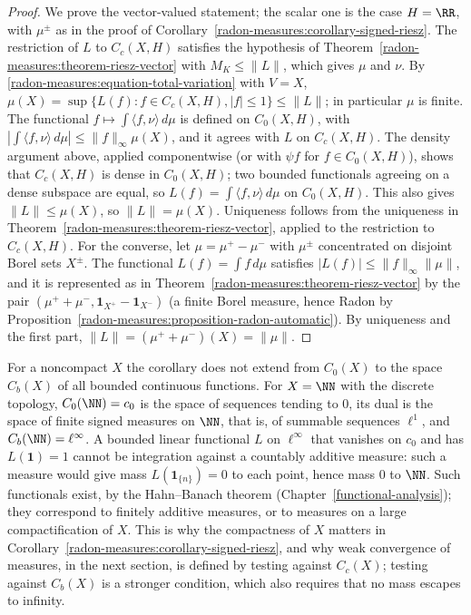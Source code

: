 \begin{proof}
We prove the vector-valued statement; the scalar one is the case $H = \RR$, with $\mu^\pm$ as in the proof of Corollary~\ref{radon-measures:corollary-signed-riesz}. The restriction of $L$ to $C_c(X, H)$
satisfies the hypothesis of Theorem~\ref{radon-measures:theorem-riesz-vector} with $M_K \leq \|L\|$, which gives $\mu$ and $\nu$. By \eqref{radon-measures:equation-total-variation} with $V = X$,
$\mu(X) = \sup\{L(f) : f \in C_c(X, H), |f| \leq 1\} \leq \|L\|$; in particular $\mu$ is finite. The functional $f \mapsto \int\langle f, \nu\rangle\,d\mu$ is defined on $C_0(X, H)$, with
$|\int\langle f, \nu\rangle\,d\mu| \leq \|f\|_\infty\mu(X)$, and it agrees with $L$ on $C_c(X, H)$. The density argument above, applied componentwise (or with $\psi f$ for $f \in C_0(X, H)$), shows that
$C_c(X, H)$ is dense in $C_0(X, H)$; two bounded functionals agreeing on a dense subspace are equal, so $L(f) = \int\langle f, \nu\rangle\,d\mu$ on $C_0(X, H)$. This also gives $\|L\| \leq \mu(X)$, so
$\|L\| = \mu(X)$. Uniqueness follows from the uniqueness in Theorem~\ref{radon-measures:theorem-riesz-vector}, applied to the restriction to $C_c(X, H)$. For the converse, let $\mu = \mu^+ - \mu^-$ with $\mu^\pm$ concentrated on disjoint Borel sets
$X^\pm$. The functional $L(f) = \int f\,d\mu$ satisfies $|L(f)| \leq \|f\|_\infty\|\mu\|$, and it is represented as in Theorem~\ref{radon-measures:theorem-riesz-vector} by the pair
$(\mu^+ + \mu^-, \mathbf{1}_{X^+} - \mathbf{1}_{X^-})$ (a finite Borel measure, hence Radon by Proposition~\ref{radon-measures:proposition-radon-automatic}). By uniqueness and the first part,
$\|L\| = (\mu^+ + \mu^-)(X) = \|\mu\|$.
\end{proof}

\begin{remark}\label{radon-measures:remark-dual-bounded-continuous}
For a noncompact $X$ the corollary does not extend from $C_0(X)$ to the space $C_b(X)$ of all bounded continuous functions. For $X = \NN$ with the discrete topology, $C_0(\NN) = c_0$ is the space of
sequences tending to $0$, its dual is the space of finite signed measures on $\NN$, that is, of summable sequences $\ell^1$, and $C_b(\NN) = \ell^\infty$. A bounded linear functional $L$ on $\ell^\infty$ that
vanishes on $c_0$ and has $L(\mathbf{1}) = 1$ cannot be integration against a countably additive measure: such a measure would give mass $L(\mathbf{1}_{\{n\}}) = 0$ to each point, hence mass $0$ to $\NN$.
Such functionals exist, by the Hahn--Banach theorem (Chapter~\ref{functional-analysis}); they correspond to finitely additive measures, or to measures on a large compactification of $X$. This is why the
compactness of $X$ matters in Corollary~\ref{radon-measures:corollary-signed-riesz}, and why weak convergence of measures, in the next section, is defined by testing against $C_c(X)$; testing
against $C_b(X)$ is a stronger condition, which also requires that no mass escapes to infinity.
\end{remark}

